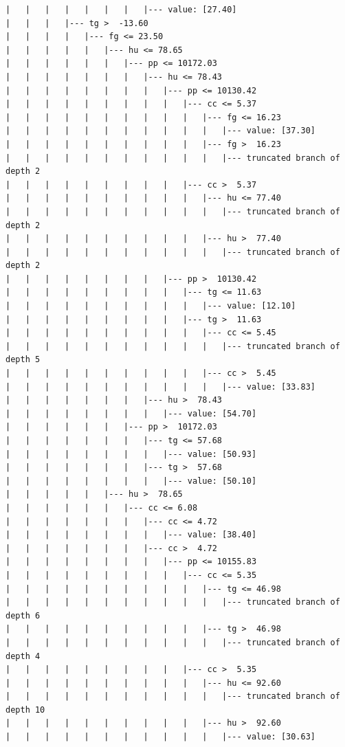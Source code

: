 \documentclass[UTF8, a4paper]{ctexart}
\begin{document}
\begin{lstlisting}
|   |   |   |   |   |   |   |--- value: [27.40]
|   |   |   |--- tg >  -13.60
|   |   |   |   |--- fg <= 23.50
|   |   |   |   |   |--- hu <= 78.65
|   |   |   |   |   |   |--- pp <= 10172.03
|   |   |   |   |   |   |   |--- hu <= 78.43
|   |   |   |   |   |   |   |   |--- pp <= 10130.42
|   |   |   |   |   |   |   |   |   |--- cc <= 5.37
|   |   |   |   |   |   |   |   |   |   |--- fg <= 16.23
|   |   |   |   |   |   |   |   |   |   |   |--- value: [37.30]
|   |   |   |   |   |   |   |   |   |   |--- fg >  16.23
|   |   |   |   |   |   |   |   |   |   |   |--- truncated branch of depth 2
|   |   |   |   |   |   |   |   |   |--- cc >  5.37
|   |   |   |   |   |   |   |   |   |   |--- hu <= 77.40
|   |   |   |   |   |   |   |   |   |   |   |--- truncated branch of depth 2
|   |   |   |   |   |   |   |   |   |   |--- hu >  77.40
|   |   |   |   |   |   |   |   |   |   |   |--- truncated branch of depth 2
|   |   |   |   |   |   |   |   |--- pp >  10130.42
|   |   |   |   |   |   |   |   |   |--- tg <= 11.63
|   |   |   |   |   |   |   |   |   |   |--- value: [12.10]
|   |   |   |   |   |   |   |   |   |--- tg >  11.63
|   |   |   |   |   |   |   |   |   |   |--- cc <= 5.45
|   |   |   |   |   |   |   |   |   |   |   |--- truncated branch of depth 5
|   |   |   |   |   |   |   |   |   |   |--- cc >  5.45
|   |   |   |   |   |   |   |   |   |   |   |--- value: [33.83]
|   |   |   |   |   |   |   |--- hu >  78.43
|   |   |   |   |   |   |   |   |--- value: [54.70]
|   |   |   |   |   |   |--- pp >  10172.03
|   |   |   |   |   |   |   |--- tg <= 57.68
|   |   |   |   |   |   |   |   |--- value: [50.93]
|   |   |   |   |   |   |   |--- tg >  57.68
|   |   |   |   |   |   |   |   |--- value: [50.10]
|   |   |   |   |   |--- hu >  78.65
|   |   |   |   |   |   |--- cc <= 6.08
|   |   |   |   |   |   |   |--- cc <= 4.72
|   |   |   |   |   |   |   |   |--- value: [38.40]
|   |   |   |   |   |   |   |--- cc >  4.72
|   |   |   |   |   |   |   |   |--- pp <= 10155.83
|   |   |   |   |   |   |   |   |   |--- cc <= 5.35
|   |   |   |   |   |   |   |   |   |   |--- tg <= 46.98
|   |   |   |   |   |   |   |   |   |   |   |--- truncated branch of depth 6
|   |   |   |   |   |   |   |   |   |   |--- tg >  46.98
|   |   |   |   |   |   |   |   |   |   |   |--- truncated branch of depth 4
|   |   |   |   |   |   |   |   |   |--- cc >  5.35
|   |   |   |   |   |   |   |   |   |   |--- hu <= 92.60
|   |   |   |   |   |   |   |   |   |   |   |--- truncated branch of depth 10
|   |   |   |   |   |   |   |   |   |   |--- hu >  92.60
|   |   |   |   |   |   |   |   |   |   |   |--- value: [30.63]

\end{lstlisting}
\end{document}
